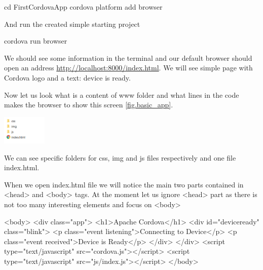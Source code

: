 \begin{shell}
cd FirstCordovaApp
cordova platform add browser
\end{shell}

And run the created simple starting project

\begin{shell}
cordova run browser
\end{shell}

We should see some information in the terminal and our default browser should open an address \url{http://localhost:8000/index.html}. We will see simple page with Cordova logo and a text: device is ready.

Now let us look what is a content of www folder and what lines in the code makes the browser to show this screen \ref{fig.basic_app}.

\includegraphics[width=60pt]{chapters/img/basic_structure.png}

We can see specific folders for css, img and js files respectively and one file index.html.

When we open index.html file we will notice the main two parts contained in <head> and <body> tags. At the moment let us ignore <head> part as there is not too many interesting elements and focus on <body>

\begin{html}
<body>
        <div class="app">
            <h1>Apache Cordova</h1>
            <div id="deviceready" class="blink">
                <p class="event listening">Connecting to Device</p>
                <p class="event received">Device is Ready</p>
            </div>
        </div>
        <script type="text/javascript" src="cordova.js"></script>
        <script type="text/javascript" src="js/index.js"></script>
</body>
\end{html}

